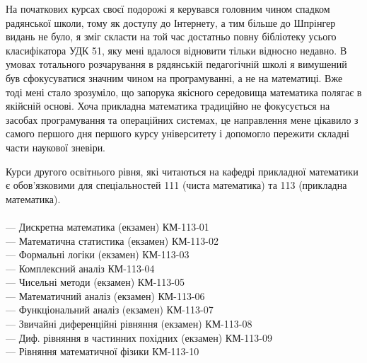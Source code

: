 На початкових курсах своєї подорожі я керувався головним
чином спадком радянської школи, тому як доступу до Інтернету,
а тим більше до Шпрінгер видань не було, я зміг скласти на той
час достатньо повну бібліотеку усього класифікатора УДК 51, яку
мені вдалося відновити тільки відносно недавно. В умовах тотального
розчарування в рядянській педагогічній школі я вимушений був сфокусуватися
значним чином на програмуванні, а не на математиці. Вже тоді мені стало
зрозуміло, що запорука якісного середовища математика полягає в якійсній
основі. Хоча прикладна математика традиційно не фокусується на засобах
програмування та операційних системах, це направлення мене цікавило
з самого першого дня першого курсу університету і допомогло пережити
складні части наукової зневіри.

Курси другого освітнього рівня, які читаються на кафедрі
прикладної математики є обов'язковими для спеціальностей
111 (чиста математика) та 113 (прикладна математика).
\\
\\
\noindent--- Дискретна математика (екзамен) КМ-113-01\\
--- Математична статистика (екзамен) КМ-113-02\\
--- Формальні логіки (екзамен) КМ-113-03\\
--- Комплексний аналіз КМ-113-04\\
--- Чисельні методи (екзамен) КМ-113-05\\
--- Математичний аналіз (екзамен) КМ-113-06\\
--- Функціональний аналіз (екзамен) КМ-113-07\\
--- Звичайні диференційні рівняння (екзамен) КМ-113-08\\
--- Диф. рівняння в частинних похідних (екзамен) КМ-113-09\\
--- Рівняння математичної фізики КМ-113-10\\

